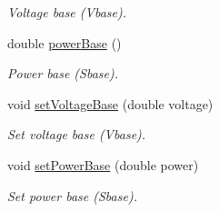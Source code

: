 \begin{DoxyCompactItemize}
\begin{DoxyCompactList}\small\item\em Voltage base (Vbase). \end{DoxyCompactList}\item 
double \hyperlink{group___models_ga6fdbd7d04d12a3f1215c92e2e20eabdb}{power\+Base} ()
\begin{DoxyCompactList}\small\item\em Power base (Sbase). \end{DoxyCompactList}\item 
void \hyperlink{group___models_gac2787bb9c323716baa2e6fba06136f2b}{set\+Voltage\+Base} (double voltage)
\begin{DoxyCompactList}\small\item\em Set voltage base (Vbase). \end{DoxyCompactList}\item 
void \hyperlink{group___models_ga3ba9ef05ea0c5037a415cfab25d03a0d}{set\+Power\+Base} (double power)
\begin{DoxyCompactList}\small\item\em Set power base (Sbase). \end{DoxyCompactList}\end{DoxyCompactItemize}
